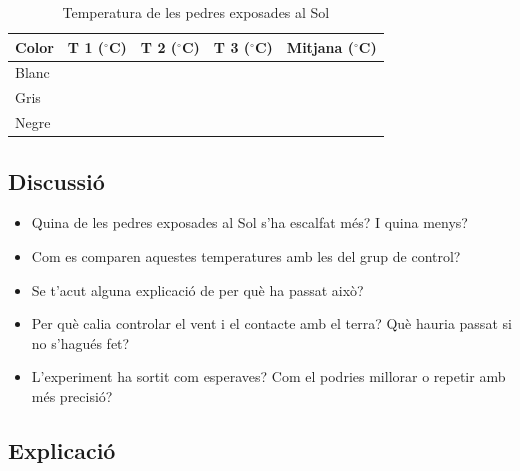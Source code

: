 \renewcommand{\arraystretch}{1}

\renewcommand{\arraystretch}{2.4}
\setlength{\tabcolsep}{4pt}

\begin{table}[h]
\centering
\caption{Temperatura de les pedres exposades al Sol}

\begin{tabular}{|
>{\centering\arraybackslash}m{1.2cm}|
>{\centering\arraybackslash}m{1.5cm}|
>{\centering\arraybackslash}m{1.5cm}|
>{\centering\arraybackslash}m{1.5cm}|
>{\centering\arraybackslash}m{1.5cm}|
}
\hline
\textbf{Color} &
\shortstack{\textbf{T 1}\\\textbf{($^\circ$C)}} &
\shortstack{\textbf{T 2}\\\textbf{($^\circ$C)}} &
\shortstack{\textbf{T 3}\\\textbf{($^\circ$C)}} &
\shortstack{\small{\textbf{Mitjana}}\\\textbf{($^\circ$C)}} \\
\hline
Blanc & & & & \\
\hline
Gris & & & & \\
\hline
Negre & & & & \\
\hline
\end{tabular}

\end{table}

\setlength{\tabcolsep}{6pt}
\renewcommand{\arraystretch}{1}

\subsection{Discussió}

\begin{itemize}
    \item Quina de les pedres exposades al Sol s’ha escalfat més? I quina menys?
    \item Com es comparen aquestes temperatures amb les del grup de control?
    \item Se t’acut alguna explicació de per què ha passat això?
    \item Per què calia controlar el vent i el contacte amb el terra? Què hauria passat si no s’hagués fet?
    \item L’experiment ha sortit com esperaves? Com el podries millorar o repetir amb més precisió?
\end{itemize}

\subsection{Explicació}

